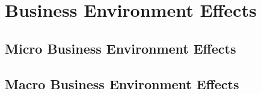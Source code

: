 \section{Business Environment Effects}
\subsection{Micro Business Environment Effects}
\subsection{Macro Business Environment Effects}